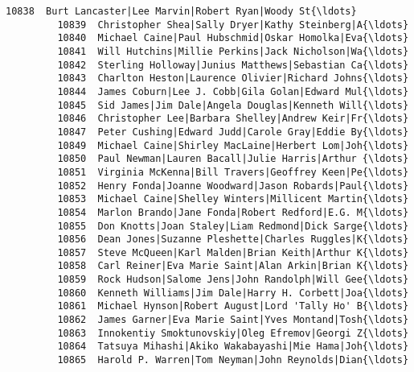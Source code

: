 \documentclass[11pt]{article}
\begin{document}
\begin{Verbatim}[commandchars=\\\{\}]
         10838  Burt Lancaster|Lee Marvin|Robert Ryan|Woody St{\ldots}   
         10839  Christopher Shea|Sally Dryer|Kathy Steinberg|A{\ldots}   
         10840  Michael Caine|Paul Hubschmid|Oskar Homolka|Eva{\ldots}   
         10841  Will Hutchins|Millie Perkins|Jack Nicholson|Wa{\ldots}   
         10842  Sterling Holloway|Junius Matthews|Sebastian Ca{\ldots}   
         10843  Charlton Heston|Laurence Olivier|Richard Johns{\ldots}   
         10844  James Coburn|Lee J. Cobb|Gila Golan|Edward Mul{\ldots}   
         10845  Sid James|Jim Dale|Angela Douglas|Kenneth Will{\ldots}   
         10846  Christopher Lee|Barbara Shelley|Andrew Keir|Fr{\ldots}   
         10847  Peter Cushing|Edward Judd|Carole Gray|Eddie By{\ldots}   
         10849  Michael Caine|Shirley MacLaine|Herbert Lom|Joh{\ldots}   
         10850  Paul Newman|Lauren Bacall|Julie Harris|Arthur {\ldots}   
         10851  Virginia McKenna|Bill Travers|Geoffrey Keen|Pe{\ldots}   
         10852  Henry Fonda|Joanne Woodward|Jason Robards|Paul{\ldots}   
         10853  Michael Caine|Shelley Winters|Millicent Martin{\ldots}   
         10854  Marlon Brando|Jane Fonda|Robert Redford|E.G. M{\ldots}   
         10855  Don Knotts|Joan Staley|Liam Redmond|Dick Sarge{\ldots}   
         10856  Dean Jones|Suzanne Pleshette|Charles Ruggles|K{\ldots}   
         10857  Steve McQueen|Karl Malden|Brian Keith|Arthur K{\ldots}   
         10858  Carl Reiner|Eva Marie Saint|Alan Arkin|Brian K{\ldots}   
         10859  Rock Hudson|Salome Jens|John Randolph|Will Gee{\ldots}   
         10860  Kenneth Williams|Jim Dale|Harry H. Corbett|Joa{\ldots}   
         10861  Michael Hynson|Robert August|Lord 'Tally Ho' B{\ldots}   
         10862  James Garner|Eva Marie Saint|Yves Montand|Tosh{\ldots}   
         10863  Innokentiy Smoktunovskiy|Oleg Efremov|Georgi Z{\ldots}   
         10864  Tatsuya Mihashi|Akiko Wakabayashi|Mie Hama|Joh{\ldots}   
         10865  Harold P. Warren|Tom Neyman|John Reynolds|Dian{\ldots}   
         

\end{Verbatim}
\end{document}
